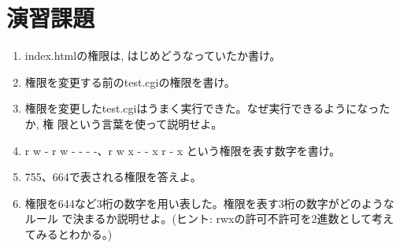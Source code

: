 \section{演習課題}

\begin{enumerate}
\item index.htmlの権限は, はじめどうなっていたか書け。

\item 権限を変更する前のtest.cgiの権限を書け。

\item 権限を変更したtest.cgiはうまく実行できた。なぜ実行できるようになったか, 権
      限という言葉を使って説明せよ。

\item r w - r w - - - -、r w x - - x r - x という権限を表す数字を書け。

\item 755、664で表される権限を答えよ。

\item 権限を644など3桁の数字を用い表した。権限を表す3桁の数字がどのようなルール
      で決まるか説明せよ。(ヒント: rwxの許可不許可を2進数として考えてみるとわかる。)
\end{enumerate}
